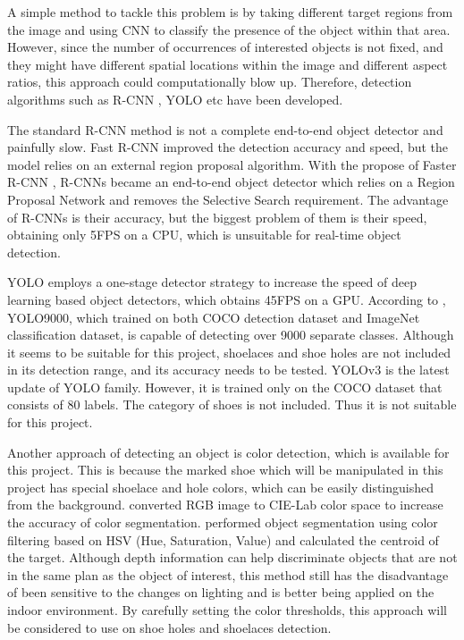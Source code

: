 A simple method to tackle this problem is by taking different target regions from the image and using CNN to classify the presence of the object within that area. However, since the number of occurrences of interested objects is not fixed, and they might have different spatial locations within the image and different aspect ratios, this approach could computationally blow up. Therefore, detection algorithms such as R-CNN \citep{RCNN}, YOLO \citep{YOLO} etc have been developed. 

The standard R-CNN method is not a complete end-to-end object detector and painfully slow. Fast R-CNN \citep{FastRCNN} improved the detection accuracy and speed, but the model relies on an external region proposal algorithm. With the propose of Faster R-CNN \citep{FasterRCNN}, R-CNNs became an end-to-end object detector which relies on a Region Proposal Network and removes the Selective Search requirement. The advantage of R-CNNs is their accuracy, but the biggest problem of them is their speed, obtaining only 5FPS on a CPU, which is unsuitable for real-time object detection. 

YOLO employs a one-stage detector strategy to increase the speed of deep learning based object detectors, which obtains 45FPS on a GPU. According to \citep{YOLO9000}, YOLO9000, which trained on both COCO detection dataset and ImageNet classification dataset, is capable of detecting over 9000 separate classes. Although it seems to be suitable for this project, shoelaces and shoe holes are not included in its detection range, and its accuracy needs to be tested. YOLOv3 \citep{YOLOv3} is the latest update of YOLO family. However, it is trained only on the COCO dataset that consists of 80 labels. The category of shoes is not included. Thus it is not suitable for this project. 

Another approach of detecting an object is color detection, which is available for this project. This is because the marked shoe which will be manipulated in this project has special shoelace and hole colors, which can be easily distinguished from the background. \citep{cie} converted RGB image to CIE-Lab color space to increase the accuracy of color segmentation. \citep{HSV} performed object segmentation using color filtering based on HSV (Hue, Saturation, Value) and calculated the centroid of the target. Although depth information can help discriminate objects that are not in the same plan as the object of interest, this method still has the disadvantage of been sensitive to the changes on lighting and is better being applied on the indoor environment. By carefully setting the color thresholds, this approach will be considered to use on shoe holes and shoelaces detection.


